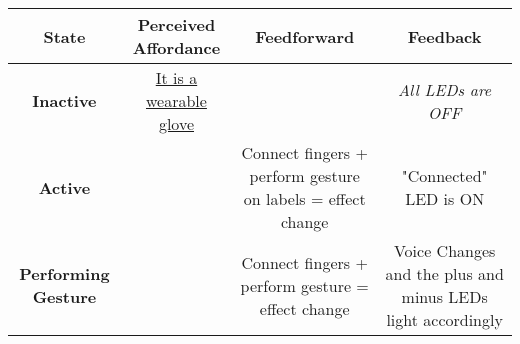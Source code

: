 \begin{center}
  \begin{tabular}{| c | c | c | c |}
    \hline
    \textbf{State} & \textbf{Perceived Affordance} & \textbf{Feedforward} & \textbf{Feedback} \\ \hline
    \textbf{Inactive} & \underline{It is a wearable glove} & & \textit{All LEDs are OFF} \\ \hline
    \textbf{Active} &  & Connect fingers + perform gesture on labels = effect change & "Connected" LED is ON \\ \hline        
    \textbf{Performing Gesture} &  & Connect fingers + perform gesture = effect change & Voice Changes and the plus and minus LEDs light accordingly \\ \hline
  \end{tabular}
\end{center}